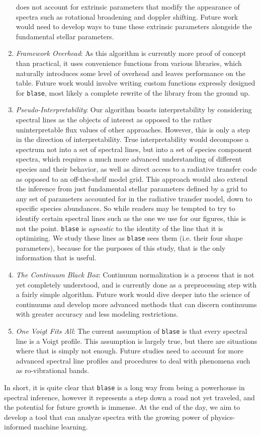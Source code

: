 \documentclass[twocolumn]{aastex631}
\begin{document}
\begin{enumerate}[label=-]
    does not account for extrinsic parameters that modify the appearance of 
    spectra such as rotational broadening and doppler shifting. Future work
    would need to develop ways to tune these extrinsic parameters alongside
    the fundamental stellar parameters.
    \item \textit{Framework Overhead}: As this algorithm is currently more 
    proof of concept than practical, it uses convenience functions from 
    various libraries, which naturally introduces some level of overhead and 
    leaves performance on the table. Future work would involve writing 
    custom functions expressly designed for \texttt{blase}, most likely a 
    complete rewrite of the library from the ground up.
    \item \textit{Pseudo-Interpretability}: Our algorithm boasts interpretability
    by considering spectral lines as the objects of interest as opposed to 
    the rather uninterpretable flux values of other approaches. However, this
    is only a step in the direction of interpretability. True interpretability
    would decompose a spectrum not into a set of spectral lines, but into a
    set of species component spectra, which requires a much more advanced 
    understanding of different species and their behavior, as well as
    direct access to a radiative transfer code as opposed to an off-the-shelf
    model grid. This approach would also extend the inference from just
    fundamental stellar parameters defined by a grid to any set of parameters
    accounted for in the radiative transfer model, down to specific species
    abundances. So while readers may be tempted to try to identify certain 
    spectral lines such as the one we use for our figures, this is not 
    the point. \texttt{blase} is \textit{agnostic} to the identity of the line
    that it is optimizing. We study these lines as \texttt{blase} sees them
    (i.e. their four shape parameters), because for the purposes of this study, 
    that is the only information that is useful.
    \item \textit{The Continuum Black Box}: Continuum normalization is a
    process that is not yet completely understood, and is currently done as 
    a preprocessing step with a fairly simple algorithm. Future work would
    dive deeper into the science of continuums and develop more advanced 
    methods that can discern continuums with greater accuracy and less
    modeling restrictions.
    \item \textit{One Voigt Fits All}: The current assumption of \texttt{blase}
    is that every spectral line is a Voigt profile. This assumption is largely
    true, but there are situations where that is simply not enough. Future
    studies need to account for more advanced spectral line profiles and 
    procedures to deal with phenomena such as ro-vibrational bands.
\end{enumerate}
In short, it is quite clear that \texttt{blase} is a long way from being a
powerhouse in spectral inference, however it represents a step down a road
not yet traveled, and the potential for future growth is immense. At the 
end of the day, we aim to develop a tool that can analyze spectra with the 
growing power of physics-informed machine learning.
\end{document}
